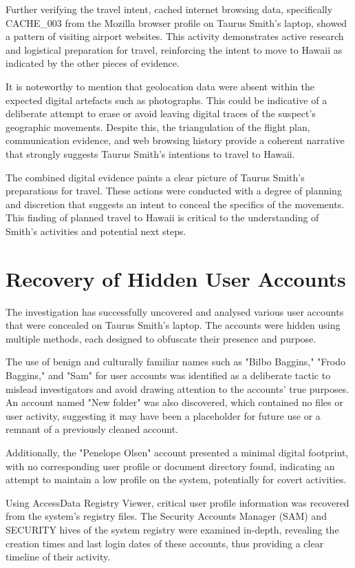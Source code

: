Further verifying the travel intent, cached internet browsing data, specifically CACHE\_003 from the Mozilla browser profile on Taurus Smith's laptop, showed a pattern of visiting airport websites. This activity demonstrates active research and logistical preparation for travel, reinforcing the intent to move to Hawaii as indicated by the other pieces of evidence.

It is noteworthy to mention that geolocation data were absent within the expected digital artefacts such as photographs. This could be indicative of a deliberate attempt to erase or avoid leaving digital traces of the suspect's geographic movements. Despite this, the triangulation of the flight plan, communication evidence, and web browsing history provide a coherent narrative that strongly suggests Taurus Smith's intentions to travel to Hawaii.

The combined digital evidence paints a clear picture of Taurus Smith's preparations for travel. These actions were conducted with a degree of planning and discretion that suggests an intent to conceal the specifics of the movements. This finding of planned travel to Hawaii is critical to the understanding of Smith's activities and potential next steps.

\section{Recovery of Hidden User Accounts}
The investigation has successfully uncovered and analysed various user accounts that were concealed on Taurus Smith's laptop. The accounts were hidden using multiple methods, each designed to obfuscate their presence and purpose.

The use of benign and culturally familiar names such as "Bilbo Baggins," "Frodo Baggins," and "Sam" for user accounts was identified as a deliberate tactic to mislead investigators and avoid drawing attention to the accounts' true purposes. An account named "New folder" was also discovered, which contained no files or user activity, suggesting it may have been a placeholder for future use or a remnant of a previously cleaned account.

Additionally, the "Penelope Olsen" account presented a minimal digital footprint, with no corresponding user profile or document directory found, indicating an attempt to maintain a low profile on the system, potentially for covert activities.

Using AccessData Registry Viewer, critical user profile information was recovered from the system's registry files. The Security Accounts Manager (SAM) and SECURITY hives of the system registry were examined in-depth, revealing the creation times and last login dates of these accounts, thus providing a clear timeline of their activity.

